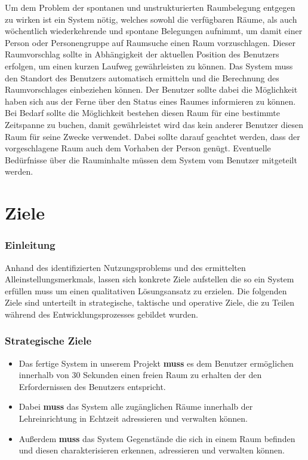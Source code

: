 Um dem Problem der spontanen und unstrukturierten Raumbelegung entgegen zu
wirken ist ein System nötig, welches sowohl die verfügbaren Räume, als auch
wöchentlich wiederkehrende und spontane Belegungen aufnimmt, um damit einer
Person oder Personengruppe auf Raumsuche einen Raum vorzuschlagen. Dieser
Raumvorschlag sollte in Abhängigkeit der aktuellen Position des Benutzers
erfolgen, um einen kurzen Laufweg gewährleisten zu können. Das System muss den
Standort des Benutzers automatisch ermitteln und die Berechnung des
Raumvorschlages einbeziehen können. 
Der Benutzer sollte dabei die Möglichkeit haben sich aus der Ferne über den
Status eines Raumes informieren zu können.
Bei Bedarf sollte die Möglichkeit bestehen diesen Raum für eine bestimmte
Zeitspanne zu buchen, damit gewährleistet wird das kein anderer Benutzer diesen
Raum für seine Zwecke verwendet.
Dabei sollte darauf geachtet werden, dass der vorgeschlagene Raum auch dem
Vorhaben der Person genügt. Eventuelle Bedürfnisse über die Rauminhalte müssen
dem System vom Benutzer mitgeteilt werden.


\section{Ziele}
\label{sec:Ziele}

\subsubsection{Einleitung}
\label{sec:Ziele_Einleitung}

Anhand des identifizierten Nutzungsproblems und des ermittelten
Alleinstellungsmerkmals, lassen sich konkrete Ziele aufstellen die so ein
System  erfüllen muss um einen qualitativen Lösungsansatz zu erzielen.   
Die folgenden Ziele sind unterteilt in strategische, taktische und operative
Ziele, die zu Teilen während des Entwicklungsprozesses gebildet wurden.

\subsubsection{Strategische Ziele}
\label{sec:Strategische_Ziele}

\begin{itemize}
	\item Das fertige System in unserem Projekt \textbf{muss} es dem Benutzer
	ermöglichen innerhalb von 30 Sekunden einen freien Raum zu erhalten der
	den Erfordernissen des Benutzers entspricht.
	\item Dabei \textbf{muss} das System alle zugänglichen Räume innerhalb
	der Lehreinrichtung in Echtzeit adressieren und verwalten können.
	\item Außerdem \textbf{muss} das System Gegenstände die sich in einem Raum
	befinden und diesen charakterisieren erkennen, adressieren und verwalten
	können.
\end{itemize}

